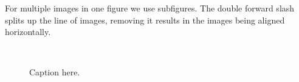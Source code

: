 \documentclass{article}
\begin{document}
\newpage

For multiple images in one figure we use subfigures. The double forward slash splits up the line of images, removing it results in the images being aligned horizontally.
    \begin{figure}[H]
    \centering
    \\
    \caption{Caption here.}
    \label{fig:examplesSubFig}
\end{figure}
\end{document}
